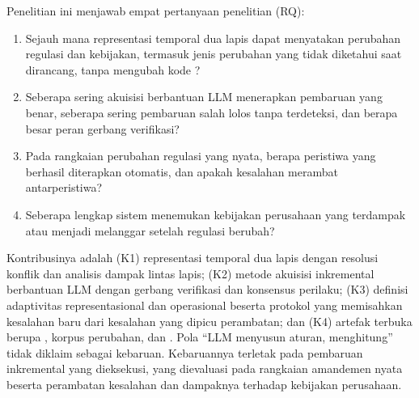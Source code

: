 Penelitian ini menjawab empat pertanyaan penelitian (RQ):
\begin{enumerate}[label=\textbf{RQ\arabic*},leftmargin=*,nosep]
  \item Sejauh mana representasi temporal dua lapis dapat menyatakan perubahan regulasi dan kebijakan, termasuk jenis perubahan yang tidak diketahui saat dirancang, tanpa mengubah kode ?
  \item Seberapa sering akuisisi berbantuan LLM menerapkan pembaruan yang benar, seberapa sering pembaruan salah lolos tanpa terdeteksi, dan berapa besar peran gerbang verifikasi?
  \item Pada rangkaian perubahan regulasi yang nyata, berapa peristiwa yang berhasil diterapkan otomatis, dan apakah kesalahan merambat antarperistiwa?
  \item Seberapa lengkap sistem menemukan kebijakan perusahaan yang terdampak atau menjadi melanggar setelah regulasi berubah?
\end{enumerate}

Kontribusinya adalah (K1) representasi temporal dua lapis dengan resolusi konflik dan analisis dampak lintas lapis; (K2) metode akuisisi inkremental berbantuan LLM dengan gerbang verifikasi dan konsensus perilaku; (K3) definisi adaptivitas representasional dan operasional beserta protokol  yang memisahkan kesalahan baru dari kesalahan yang dipicu perambatan; dan (K4) artefak terbuka berupa , korpus perubahan, dan . Pola ``LLM menyusun aturan,  menghitung'' tidak diklaim sebagai kebaruan. Kebaruannya terletak pada pembaruan inkremental  yang dieksekusi, yang dievaluasi pada rangkaian amandemen nyata beserta perambatan kesalahan dan dampaknya terhadap kebijakan perusahaan.
